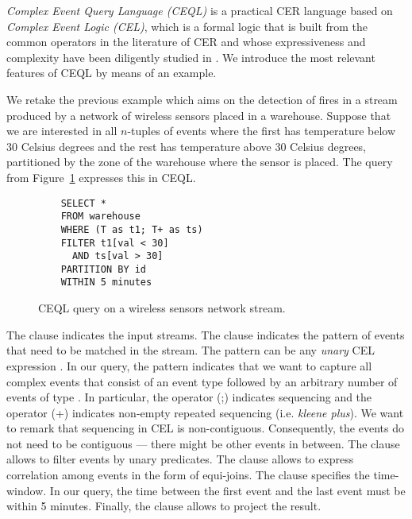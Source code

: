 \emph{Complex Event Query Language (CEQL)} is a practical CER language based on \emph{Complex Event Logic (CEL)}, which is a formal logic that is built from the common operators in the literature of CER and whose expressiveness and complexity have been diligently studied in \cite{formal-framework-cep,on-the-expressiveness,formal-framework-cer}. We introduce the most relevant features of CEQL by means of an example.

\begin{example}
We retake the previous example which aims on the detection of fires in a stream produced by a network of wireless sensors placed in a warehouse. Suppose that we are interested in all $n$-tuples of  events where the first has temperature below $30$ Celsius degrees and the rest has temperature above $30$ Celsius degrees, partitioned by the zone of the warehouse where the sensor is placed. The query from Figure~\ref{fig:query:2} expresses this in CEQL.

\begin{figure}[H]
  \begin{verbatim}
    SELECT *
    FROM warehouse
    WHERE (T as t1; T+ as ts)
    FILTER t1[val < 30]
      AND ts[val > 30]
    PARTITION BY id
    WITHIN 5 minutes
  \end{verbatim}
  \caption{CEQL query on a wireless sensors network stream.}
  \label{fig:query:2}
\end{figure}

The  clause indicates the input streams. The  clause indicates the pattern of events that need to be matched in the stream. The pattern can be any \emph{unary} CEL expression \cite{formal-framework-cer}. In our query, the pattern  indicates that we want to capture all complex events that consist of an event type  followed by an arbitrary number of events of type . In particular, the operator (;) indicates sequencing and the operator (+) indicates non-empty repeated sequencing (i.e. \emph{kleene plus}). We want to remark that sequencing in CEL is non-contiguous. Consequently, the  events do not need to be contiguous --- there might be other events in between. The  clause allows to filter events by unary predicates. The clause  allows to express correlation among events in the form of equi-joins. The  clause specifies the time-window. In our query, the time between the first event  and the last event  must be within 5 minutes. Finally, the  clause allows to project the result.
\end{example}

